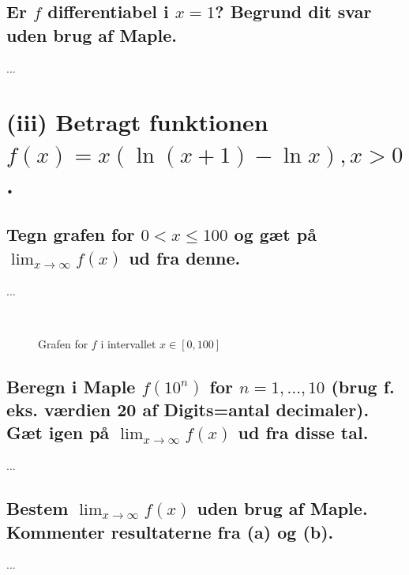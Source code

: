 \documentclass[11pt,a4paper]{article}
\newcommand{\limit}[2]{\lim_{#1 \rightarrow #2}}
\begin{document}
\subsection
{
    \mdseries
    Er $f$ differentiabel i $x=1$? Begrund dit svar uden brug af Maple.
}
...


\section
{
    (iii) \mdseries
    Betragt funktionen $f(x) = x(\ln(x + 1) - \ln x), x > 0$.
}

\subsection
{
    \mdseries
    Tegn grafen for $0 < x \leq 100$ og gæt på $\limit{x}{\infty} f(x)$ ud
    fra denne.
}
\begin{multicols}{2}
    ...

    \vfill{\ }\columnbreak

    \begin{figure}[H]
        \caption{Grafen for $f$ i intervallet $x \in [0,100]$}
        \label{fig:3.3(iii)a-1}
    \end{figure}

\end{multicols}



\subsection
{
    \mdseries
    Beregn i Maple $f(10^n)$ for $n = 1, \dots, 10$ (brug f. eks. værdien 20
    af Digits=antal decimaler). Gæt igen på $\limit{x}{\infty} f(x)$ ud fra
    disse tal.
}
...

\subsection
{
    \mdseries
    Bestem $\limit{x}{\infty} f(x)$ uden brug af Maple. Kommenter resultaterne
    fra (a) og (b).
}
...
\end{document}
